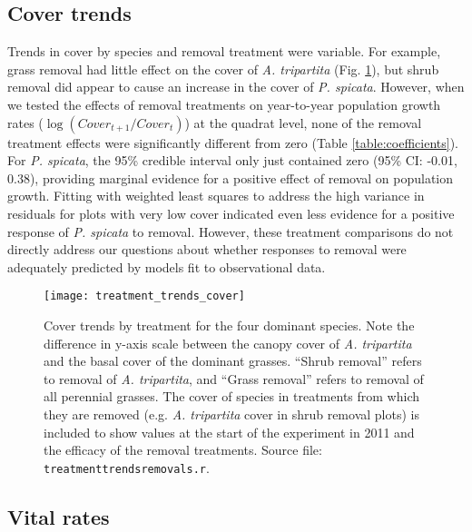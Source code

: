 \documentclass[11pt]{article}
\begin{document}
\begin{doublespacing}
\subsection*{Cover trends}

Trends in cover by species and removal treatment were variable. For example, grass removal had little effect on the cover of \textit{A. tripartita} 
(Fig. \ref{fig:CoverTrends}), but shrub removal did appear to cause an increase in the cover of \textit{P. spicata}. 
However, when we tested the effects of removal treatments on year-to-year population growth rates ($\log(Cover_{t+1}/Cover_t)$) at the quadrat level,
 none of the removal treatment effects were significantly different from zero (Table \ref{table:coefficients}). For \textit{P. spicata}, 
the 95\% credible interval only just contained zero (95\% CI: -0.01, 0.38), providing marginal evidence for a positive effect of removal on population growth. 
Fitting with weighted least squares to address the high variance in residuals for plots with very low cover indicated even less evidence for a positive 
response of  \textit{P. spicata} to removal. However, these treatment comparisons do not directly address our questions about whether 
responses to removal were adequately predicted by models fit to observational data. 

\begin{figure}[tbp]
\centering
\texttt{[image: treatment\_trends\_cover]}
\caption{Cover trends by treatment for the four dominant species.  Note the difference in y-axis scale between the canopy cover of \textit{A. tripartita} and 
the basal cover of the dominant grasses. ``Shrub removal'' refers to removal of \textit{A. tripartita}, and ``Grass removal'' refers to removal of all perennial grasses. 
The cover of species in treatments from which they are removed (e.g. \textit{A. tripartita} cover in shrub removal plots) is included to show values at the start 
of the experiment in 2011 and the efficacy of the removal treatments. Source file: \texttt{treatment\textunderscore trends\textunderscore removals.r}.}
\label{fig:CoverTrends}
\end{figure}


\subsection*{Vital rates}


\end{doublespacing}
\end{document}
